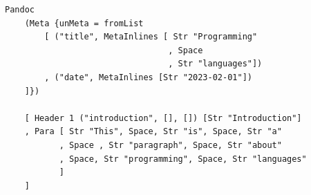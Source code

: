 \begin{lstlisting}[caption={The internal Pandoc AST of \Cref{markdownProgram}.}, captionpos=b, label={internalPandoc}]
Pandoc
    (Meta {unMeta = fromList
        [ ("title", MetaInlines [ Str "Programming"
                                 , Space
                                 , Str "languages"])
        , ("date", MetaInlines [Str "2023-02-01"])
    ]})

    [ Header 1 ("introduction", [], []) [Str "Introduction"]
    , Para [ Str "This", Space, Str "is", Space, Str "a"
           , Space , Str "paragraph", Space, Str "about"
           , Space, Str "programming", Space, Str "languages"
           ]
    ]
\end{lstlisting}